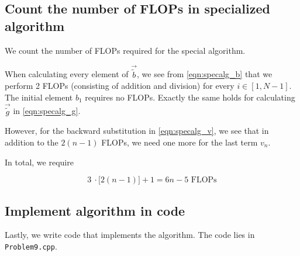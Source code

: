 \documentclass[english,notitlepage]{revtex4-1}  %
\begin{document}
\subsection{Count the number of FLOPs in specialized algorithm}

We count the number of FLOPs required for the special algorithm.

When calculating every element of $\vec{\tilde{b}}$, we see from \eqref{eqn:specalg_b} that we perform 2 FLOPs (consisting of addition and division) for every $i \in [1, N-1]$. The initial element $b_1$ requires no FLOPs. Exactly the same holds for calculating $\vec{\tilde{g}}$ in \eqref{eqn:specalg_g}.

However, for the backward substitution in \eqref{eqn:specalg_v}, we see that in addition to the $2(n-1)$ FLOPs, we need one more for the last term $v_n$.

In total, we require

\begin{equation}
  3 ~ \cdotp \big[ 2(n-1)\big] + 1 = 6n-5 \text{ FLOPs}
\end{equation}

\subsection{Implement algorithm in code}

Lastly, we write code that implements the algorithm. The code lies in \lstinline{Problem9.cpp}.
\end{document}
